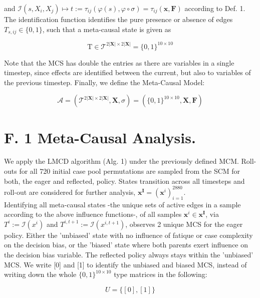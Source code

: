 \documentclass[10pt]{article}
\begin{document}
and $\mathcal{I}\left(s, X_{i}, X_{j}\right) \mapsto t:=\tau_{i j}(\varphi(s), \varphi \circ \sigma)=\tau_{i j}(\mathbf{x}, \mathbf{F})$ according to Def. 1. The identification function identifies the pure presence or absence of edges $T_{s, i j} \in\{0,1\}$, such that a meta-causal state is given as


\begin{equation*}
\mathrm{T} \in \mathcal{T}^{2|\mathbf{X}| \times 2|\mathbf{X}|}=\{0,1\}^{10 \times 10} \tag{44}
\end{equation*}


Note that the MCS has double the entries as there are variables in a single timestep, since effects are identified between the current, but also to variables of the previous timestep. Finally, we define the Meta-Causal Model:


\begin{equation*}
\mathcal{A}=\left(\mathcal{T}^{2|\mathbf{X}| \times 2|\mathbf{X}|}, \mathbf{X}, \sigma\right)=\left(\{0,1\}^{10 \times 10}, \mathbf{X}, \mathbf{F}\right) \tag{45}
\end{equation*}


\section*{F. 1 Meta-Causal Analysis.}
We apply the LMCD algorithm (Alg. 1) under the previously defined MCM. Roll-outs for all 720 initial case pool permutations are sampled from the SCM for both, the eager and reflected, policy. States transition across all timesteps and roll-out are considered for further analysis, $\mathbf{x}^{\mathbf{I}}=\left(\mathbf{x}^{i}\right)_{i=1}^{2880}$.\\
Identifying all meta-causal states -the unique sets of active edges in a sample according to the above influence functions-, of all samples $\mathbf{x}^{i} \in \mathbf{x}^{\mathbf{I}}$, via $T^{i}:=\mathcal{I}\left(x^{i}\right)$ and $T^{i, t+1}:=\mathcal{I}\left(x^{i, t+1}\right)$, observes 2 unique MCS for the eager policy. Either the 'unbiased' state with no influence of fatique or case complexity on the decision bias, or the 'biased' state where both parents exert influence on the decision bias variable. The reflected policy always stays within the 'unbiased' MCS. We write [0] and [1] to identify the unbiased and biased MCS, instead of writing down the whole $\{0,1\}^{10 \times 10}$ type matrices in the following:


\begin{equation*}
U=\{[0],[1]\} \tag{46}
\end{equation*}
\end{document}

